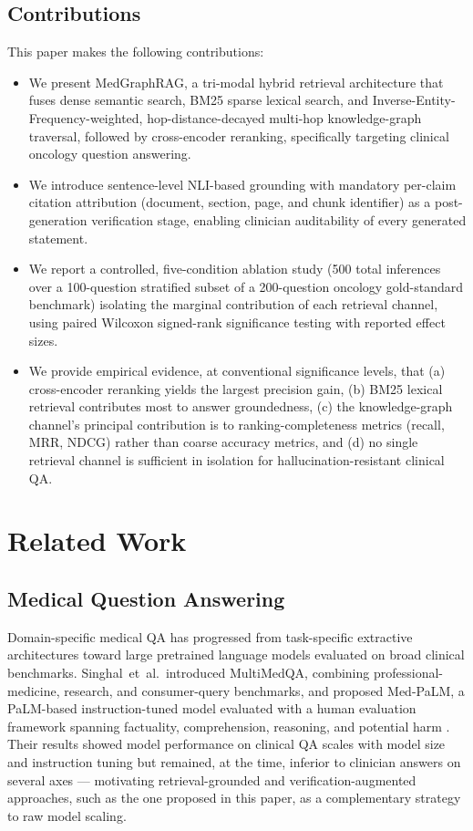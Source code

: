 \documentclass[conference]{IEEEtran}
\begin{document}
\subsection{Contributions}
This paper makes the following contributions:
\begin{itemize}
    \item We present MedGraphRAG, a tri-modal hybrid retrieval architecture that fuses dense semantic search, BM25 sparse lexical search, and Inverse-Entity-Frequency-weighted, hop-distance-decayed multi-hop knowledge-graph traversal, followed by cross-encoder reranking, specifically targeting clinical oncology question answering.
    \item We introduce sentence-level NLI-based grounding with mandatory per-claim citation attribution (document, section, page, and chunk identifier) as a post-generation verification stage, enabling clinician auditability of every generated statement.
    \item We report a controlled, five-condition ablation study (500 total inferences over a 100-question stratified subset of a 200-question oncology gold-standard benchmark) isolating the marginal contribution of each retrieval channel, using paired Wilcoxon signed-rank significance testing with reported effect sizes.
    \item We provide empirical evidence, at conventional significance levels, that (a) cross-encoder reranking yields the largest precision gain, (b) BM25 lexical retrieval contributes most to answer groundedness, (c) the knowledge-graph channel's principal contribution is to ranking-completeness metrics (recall, MRR, NDCG) rather than coarse accuracy metrics, and (d) no single retrieval channel is sufficient in isolation for hallucination-resistant clinical QA.
\end{itemize}

\section{Related Work}

\subsection{Medical Question Answering}
Domain-specific medical QA has progressed from task-specific extractive architectures toward large pretrained language models evaluated on broad clinical benchmarks. Singhal~et~al.\ introduced MultiMedQA, combining professional-medicine, research, and consumer-query benchmarks, and proposed Med-PaLM, a PaLM-based instruction-tuned model evaluated with a human evaluation framework spanning factuality, comprehension, reasoning, and potential harm \cite{singhal2023large}. Their results showed model performance on clinical QA scales with model size and instruction tuning but remained, at the time, inferior to clinician answers on several axes \cite{singhal2023large} --- motivating retrieval-grounded and verification-augmented approaches, such as the one proposed in this paper, as a complementary strategy to raw model scaling.
\end{document}
